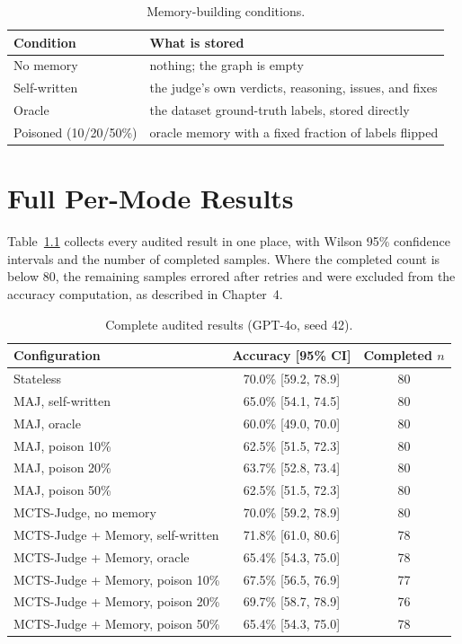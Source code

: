 \documentclass[14pt,a4paper]{extreport}
\begin{document}
\begin{table}[h]
\centering
\caption{Memory-building conditions.}
\label{tab:appcond}
\begin{tabular}{ll}
\toprule
Condition & What is stored \\
\midrule
No memory & nothing; the graph is empty \\
Self-written & the judge's own verdicts, reasoning, issues, and fixes \\
Oracle & the dataset ground-truth labels, stored directly \\
Poisoned (10/20/50\%) & oracle memory with a fixed fraction of labels flipped \\
\bottomrule
\end{tabular}
\end{table}

\chapter{Full Per-Mode Results}

Table~\ref{tab:appfull} collects every audited result in one place, with Wilson 95\% confidence intervals and the number of completed samples. Where the completed count is below 80, the remaining samples errored after retries and were excluded from the accuracy computation, as described in Chapter~4.

\begin{table}[h]
\centering
\caption{Complete audited results (GPT-4o, seed 42).}
\label{tab:appfull}
\begin{tabular}{lcc}
\toprule
Configuration & Accuracy [95\% CI] & Completed $n$ \\
\midrule
Stateless & 70.0\% [59.2, 78.9] & 80 \\
MAJ, self-written & 65.0\% [54.1, 74.5] & 80 \\
MAJ, oracle & 60.0\% [49.0, 70.0] & 80 \\
MAJ, poison 10\% & 62.5\% [51.5, 72.3] & 80 \\
MAJ, poison 20\% & 63.7\% [52.8, 73.4] & 80 \\
MAJ, poison 50\% & 62.5\% [51.5, 72.3] & 80 \\
MCTS-Judge, no memory & 70.0\% [59.2, 78.9] & 80 \\
MCTS-Judge + Memory, self-written & 71.8\% [61.0, 80.6] & 78 \\
MCTS-Judge + Memory, oracle & 65.4\% [54.3, 75.0] & 78 \\
MCTS-Judge + Memory, poison 10\% & 67.5\% [56.5, 76.9] & 77 \\
MCTS-Judge + Memory, poison 20\% & 69.7\% [58.7, 78.9] & 76 \\
MCTS-Judge + Memory, poison 50\% & 65.4\% [54.3, 75.0] & 78 \\
\bottomrule
\end{tabular}
\end{table}
\end{document}
